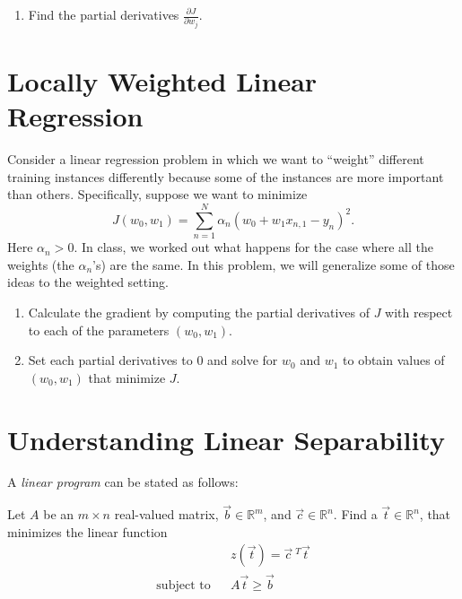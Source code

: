 \documentclass[11pt]{article}
\begin{document}
\begin{enumerate}

\item  Find the partial derivatives $\frac{\partial J}{\partial w_j}$.  
 
\solution{


}

\end{enumerate}



\section{Locally Weighted Linear Regression }
Consider a linear regression problem in which we want to ``weight'' different training instances differently because some of the instances are more important than others. Specifically, suppose we want to minimize
\begin{equation*}
J(w_0,w_1) =  \sum_{n=1}^{N}{\alpha_{n} \left( w_0 + w_1 x_{n,1} - y_{n}\right)^2}.
\end{equation*}
Here $\alpha_n > 0 $. In class, we worked out what happens for the case where all the weights (the $\alpha_{n}$'s) are the same. In this problem, we will generalize some of those ideas to the weighted setting. 

\begin{enumerate}

\item {} Calculate the gradient by computing the partial derivatives of $J$ with respect to each of the parameters $(w_0, w_1)$.

\solution{

}
\item {} Set each partial derivatives to $0$ and solve for $w_0$ and $w_1$ to obtain values of $(w_0,w_1)$ that minimize $J$. 

\solution{
}

\end{enumerate}

\section{Understanding Linear Separability }

\begin{definition}
A {\em linear program} can be stated as follows:

Let 
$A$ be an $m \times n$ real-valued matrix,
$\vec{b} \in \mathbb{R}^m$, and $\vec{c} \in \mathbb{R}^n$.
Find a $\vec{t} \in \mathbb{R}^n$, that minimizes the linear function
\begin{eqnarray*}
  & & z(\vec{t}) = \vec{c}~^T \vec{t} \\
\textrm{subject to} & & A \vec{t} \geq \vec{b}
\end{eqnarray*}
\end{definition}
\end{document}
